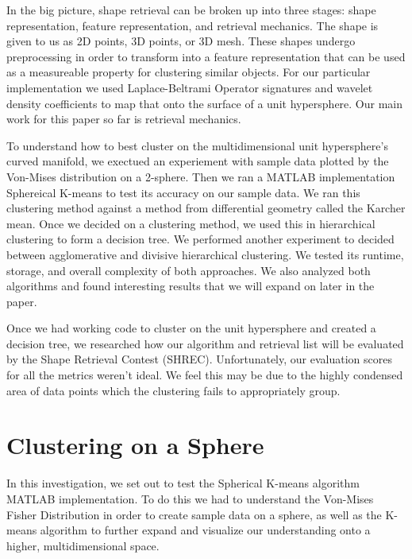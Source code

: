 \documentclass{article}
\begin{document}
In the big picture, shape retrieval can be broken up into three stages:
shape representation, feature representation, and retrieval mechanics. The shape is given to us as 2D points, 3D points, or 3D mesh. These shapes undergo preprocessing in order to transform into a feature representation that can be used as a measureable property for clustering similar objects. For our particular implementation we used Laplace-Beltrami Operator signatures and wavelet density coefficients to map that onto the surface of a unit hypersphere. Our main work for this paper so far is retrieval mechanics.

To understand how to best cluster on the multidimensional unit hypersphere's curved manifold, we exectued an experiement with sample data plotted by the Von-Mises distribution on a 2-sphere. Then we ran a MATLAB implementation Sphereical K-means to test its accuracy on our sample data. We ran this clustering method against a method from differential geometry called the Karcher mean. Once we decided on a clustering method, we used this in hierarchical clustering to form a decision tree. We performed another experiment to decided between agglomerative and divisive hierarchical clustering. We tested its runtime, storage, and overall complexity of both approaches. We also analyzed both algorithms and found interesting results that we will expand on later in the paper.

Once we had working code to cluster on the unit hypersphere and
created a decision tree, we researched how our algorithm and retrieval list will be evaluated by the Shape Retrieval Contest (SHREC). Unfortunately, our evaluation scores for all the metrics weren't ideal. We feel this may be due to the highly condensed area of data points which the clustering fails to appropriately group.

\part*{Clustering on a Sphere}
In this investigation, we set out to test the Spherical K-means algorithm MATLAB implementation. To do this we had to understand the Von-Mises Fisher Distribution in order to create sample data on a sphere, as well as the K-means algorithm to further expand and visualize our understanding onto a higher, multidimensional space.








\newpage


\end{document}
